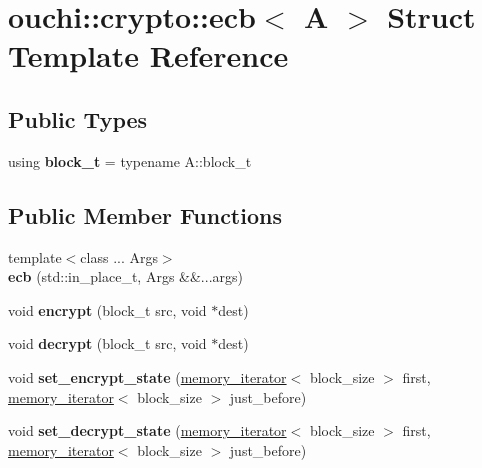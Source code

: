 \hypertarget{structouchi_1_1crypto_1_1ecb}{}\section{ouchi\+::crypto\+::ecb$<$ A $>$ Struct Template Reference}
\label{structouchi_1_1crypto_1_1ecb}
\subsection*{Public Types}
\begin{DoxyCompactItemize}
\item 
\mbox{\label{structouchi_1_1crypto_1_1ecb_ab9eea2c37dbfc61f7d3e14262372ff2e}} 
using {\bfseries block\+\_\+t} = typename A\+::block\+\_\+t
\end{DoxyCompactItemize}
\subsection*{Public Member Functions}
\begin{DoxyCompactItemize}
\item 
\mbox{\label{structouchi_1_1crypto_1_1ecb_a7999f20a96969786f4cd73f2c4465ab5}} 
{\footnotesize template$<$class ... Args$>$ }\\{\bfseries ecb} (std\+::in\+\_\+place\+\_\+t, Args \&\&...args)
\item 
\mbox{\label{structouchi_1_1crypto_1_1ecb_aaff914c9c147326d0de0668b39d7fac1}} 
void {\bfseries encrypt} (block\+\_\+t src, void $\ast$dest)
\item 
\mbox{\label{structouchi_1_1crypto_1_1ecb_a8b52a8e6f904340abc2776e99c248b51}} 
void {\bfseries decrypt} (block\+\_\+t src, void $\ast$dest)
\item 
\mbox{\label{structouchi_1_1crypto_1_1ecb_ae5efd04b373ef86d6b093c970d65fabf}} 
void {\bfseries set\+\_\+encrypt\+\_\+state} (\mbox{\hyperlink{structouchi_1_1crypto_1_1memory__iterator}{memory\+\_\+iterator}}$<$ block\+\_\+size $>$ first, \mbox{\hyperlink{structouchi_1_1crypto_1_1memory__iterator}{memory\+\_\+iterator}}$<$ block\+\_\+size $>$ just\+\_\+before)
\item 
\mbox{\label{structouchi_1_1crypto_1_1ecb_a6160232aec4e89933404282a470f6c69}} 
void {\bfseries set\+\_\+decrypt\+\_\+state} (\mbox{\hyperlink{structouchi_1_1crypto_1_1memory__iterator}{memory\+\_\+iterator}}$<$ block\+\_\+size $>$ first, \mbox{\hyperlink{structouchi_1_1crypto_1_1memory__iterator}{memory\+\_\+iterator}}$<$ block\+\_\+size $>$ just\+\_\+before)
\end{DoxyCompactItemize}
